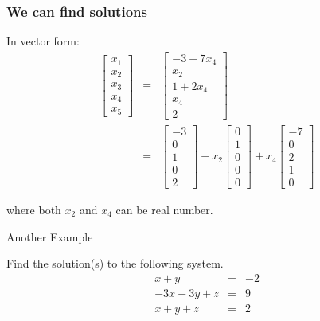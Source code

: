 \begin{frame}
  \frametitle{We can find solutions}

  In vector form:
  \begin{eqnarray*}
    \left[ \begin{array}{r}x_1\\x_2\\x_3\\x_4\\x_5\end{array}\right] & = &
    \left[ \begin{array}{r}-3 - 7x_4\\x_2\\1 + 2x_4\\x_4\\2\end{array}\right] \\
    & = &
    \left[ \begin{array}{r}-3\\0\\1\\0\\2\end{array}\right]
    + x_2 \left[ \begin{array}{r}0\\1\\0\\0\\0\end{array}\right]
    + x_4 \left[ \begin{array}{r}-7\\0\\2\\1\\0\end{array}\right]
  \end{eqnarray*}

  where both $x_2$ and $x_4$ can be  real number.


\end{frame}


\begin{frame}{Another Example}

  Find the solution(s) to the following system.
  \begin{eqnarray*}
    x +  y   & = & -2 \\
    -3x - 3y + z  & = & 9 \\
     x + y + z & = & 2
  \end{eqnarray*}


  
\end{frame}


